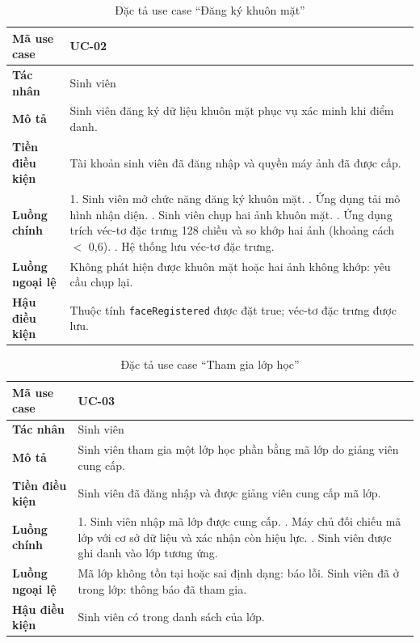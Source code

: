 \begin{table}[H]
\centering
\small
\caption{Đặc tả use case ``Đăng ký khuôn mặt''}
\label{tab:uc-face}
\begin{tabular}{|p{3cm}|p{10.6cm}|}
\hline
\textbf{Mã use case} & UC-02 \\ \hline
\textbf{Tác nhân} & Sinh viên \\ \hline
\textbf{Mô tả} & Sinh viên đăng ký dữ liệu khuôn mặt phục vụ xác minh khi điểm danh. \\ \hline
\textbf{Tiền điều kiện} & Tài khoản sinh viên đã đăng nhập và quyền máy ảnh đã được cấp. \\ \hline
\textbf{Luồng chính} & 1. Sinh viên mở chức năng đăng ký khuôn mặt. \newline 2. Ứng dụng tải mô hình nhận diện. \newline 3. Sinh viên chụp hai ảnh khuôn mặt. \newline 4. Ứng dụng trích véc-tơ đặc trưng 128 chiều và so khớp hai ảnh (khoảng cách $<$ 0,6). \newline 5. Hệ thống lưu véc-tơ đặc trưng. \\ \hline
\textbf{Luồng ngoại lệ} & Không phát hiện được khuôn mặt hoặc hai ảnh không khớp: yêu cầu chụp lại. \\ \hline
\textbf{Hậu điều kiện} & Thuộc tính \texttt{faceRegistered} được đặt true; véc-tơ đặc trưng được lưu. \\ \hline
\end{tabular}
\end{table}

\begin{table}[H]
\centering
\small
\caption{Đặc tả use case ``Tham gia lớp học''}
\label{tab:uc-join}
\begin{tabular}{|p{3cm}|p{10.6cm}|}
\hline
\textbf{Mã use case} & UC-03 \\ \hline
\textbf{Tác nhân} & Sinh viên \\ \hline
\textbf{Mô tả} & Sinh viên tham gia một lớp học phần bằng mã lớp do giảng viên cung cấp. \\ \hline
\textbf{Tiền điều kiện} & Sinh viên đã đăng nhập và được giảng viên cung cấp mã lớp. \\ \hline
\textbf{Luồng chính} & 1. Sinh viên nhập mã lớp được cung cấp. \newline 2. Máy chủ đối chiếu mã lớp với cơ sở dữ liệu và xác nhận còn hiệu lực. \newline 3. Sinh viên được ghi danh vào lớp tương ứng. \\ \hline
\textbf{Luồng ngoại lệ} & Mã lớp không tồn tại hoặc sai định dạng: báo lỗi. Sinh viên đã ở trong lớp: thông báo đã tham gia. \\ \hline
\textbf{Hậu điều kiện} & Sinh viên có trong danh sách của lớp. \\ \hline
\end{tabular}
\end{table}

